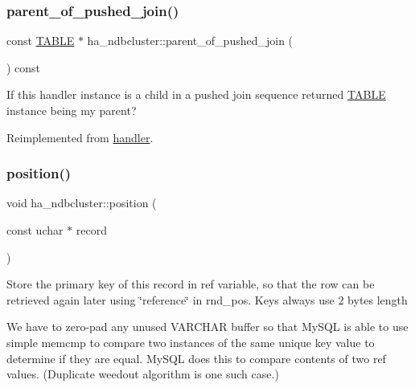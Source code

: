 \mbox{\label{classha__ndbcluster_a9faa32fde75fed4ebafffd11b6c5638e}} 
\subsubsection{\texorpdfstring{parent\+\_\+of\+\_\+pushed\+\_\+join()}{parent\_of\_pushed\_join()}}
{\footnotesize\ttfamily const \mbox{\hyperlink{structTABLE}{T\+A\+B\+LE}} $\ast$ ha\+\_\+ndbcluster\+::parent\+\_\+of\+\_\+pushed\+\_\+join (\begin{DoxyParamCaption}{ }\end{DoxyParamCaption}) const\hspace{0.3cm}{\ttfamily [virtual]}}

If this handler instance is a child in a pushed join sequence returned \mbox{\hyperlink{structTABLE}{T\+A\+B\+LE}} instance being my parent? 

Reimplemented from \mbox{\hyperlink{classhandler_aaef865015edc575d0a50d1a6f5b13e4a}{handler}}.

\mbox{\label{classha__ndbcluster_ae47b8413b29048108a6ee92af729ea46}} 
\subsubsection{\texorpdfstring{position()}{position()}}
{\footnotesize\ttfamily void ha\+\_\+ndbcluster\+::position (\begin{DoxyParamCaption}\item[{const uchar $\ast$}]{record }\end{DoxyParamCaption})\hspace{0.3cm}{\ttfamily [virtual]}}

Store the primary key of this record in ref variable, so that the row can be retrieved again later using \char`\"{}reference\char`\"{} in rnd\+\_\+pos. Keys always use 2 bytes length

We have to zero-\/pad any unused V\+A\+R\+C\+H\+AR buffer so that My\+S\+QL is able to use simple memcmp to compare two instances of the same unique key value to determine if they are equal. My\+S\+QL does this to compare contents of two \textquotesingle{}ref\textquotesingle{} values. (Duplicate weedout algorithm is one such case.)

